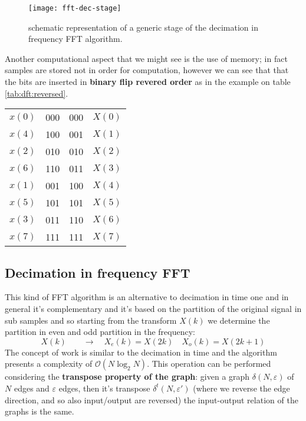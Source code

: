 	\begin{figure}[bht]
		\centering \texttt{[image: fft-dec-stage]}
		\caption{schematic representation of a generic stage of the decimation in frequency FFT algorithm.}
		\label{fig:dft:decstage}
	\end{figure}
	
	Another computational aspect that we might see is the use of memory; in fact samples are stored not in order for computation, however we can see that that the bits are inserted in \textbf{binary flip revered order} as in the example on table \ref{tab:dft:reversed}.
	\begin{SCtable}[2][bht]
		\centering
		\begin{tabular}{c c | c c}
			$x(0)$ & 000 & 000 & $X(0)$ \\
			$x(4)$ & 100 & 001 & $X(1)$ \\
			$x(2)$ & 010 & 010 & $X(2)$ \\
			$x(6)$ & 110 & 011 & $X(3)$ \\
			$x(1)$ & 001 & 100 & $X(4)$ \\
			$x(5)$ & 101 & 101 & $X(5)$ \\
			$x(3)$ & 011 & 110 & $X(6)$ \\
			$x(7)$ & 111 & 111 & $X(7)$ \\
		\end{tabular} \caption{example of binary revered order that's used in performing the the fast Fourier transform.} \label{tab:dft:reversed}
	\end{SCtable}
	
\subsection{Decimation in frequency FFT}
	This kind of FFT algorithm is an alternative to decimation in time one and in general it's complementary and it's based on the partition of the original signal in sub samples and so starting from the transform $X(k)$ we determine the partition in even and odd partition in the frequency:
	\[ X(k) \qquad \rightarrow \quad X_e(k ) = X(2k) \quad X_o(k) = X(2k+1) \]
	The concept of work is similar to the decimation in time and the algorithm presents a complexity of $\mathcal O(N\log_2N)$. This operation can be performed considering the \textbf{transpose property of the graph}: given a graph $\delta(N,\varepsilon)$ of $N$ edges and $\varepsilon$ edges, then it's transpose $\delta^t(N,\varepsilon')$ (where we reverse the edge direction, and so also input/output are reversed) the input-output relation of the graphs is the same. 
	
